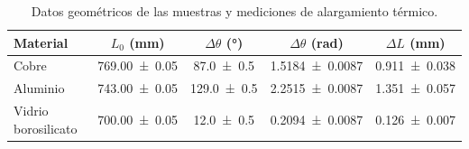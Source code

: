     \begin{table}[H]
        \centering
        \caption{Datos geométricos de las muestras y mediciones de alargamiento térmico.}
        \label{tab:datos_dilatacion}
        \begin{tabular}{lcccc}
            \toprule
            \textbf{Material} & $L_0$ (mm) & $\Delta\theta$ (°) & $\Delta\theta$ (rad) & $\Delta L$ (mm) \\
            \midrule
            Cobre & \num{769,00 \pm 0,05} & \num{87,0 \pm 0,5} & \num{1,5184 \pm 0,0087} & \num{0,911 \pm 0,038} \\
            Aluminio & \num{743,00 \pm 0,05} & \num{129,0 \pm 0,5} & \num{2,2515 \pm 0,0087} & \num{1,351 \pm 0,057} \\
            Vidrio borosilicato & \num{700,00 \pm 0,05} & \num{12,0 \pm 0,5} & \num{0,2094 \pm 0,0087} & \num{0,126 \pm 0,007} \\
            \bottomrule
        \end{tabular}
    \end{table}